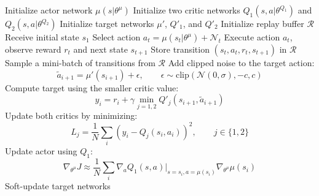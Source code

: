 \documentclass{article}
\begin{document}
\begin{algorithm}[t]
\caption{TD3}
\label{alg:td3}
\begin{algorithmic}[1]
\State Initialize actor network $\mu(s|\theta^\mu)$
\State Initialize two critic networks $Q_1(s,a|\theta^{Q_1})$ and $Q_2(s,a|\theta^{Q_2})$
\State Initialize target networks $\mu'$, $Q'_1$, and $Q'_2$
\State Initialize replay buffer $\mathcal{R}$
    \State Receive initial state $s_1$
        \State Select action $a_t = \mu(s_t|\theta^\mu) + \mathcal{N}_t$
        \State Execute action $a_t$, observe reward $r_t$ and next state $s_{t+1}$
        \State Store transition $(s_t,a_t,r_t,s_{t+1})$ in $\mathcal{R}$
        \State Sample a mini-batch of transitions from $\mathcal{R}$
        \State Add clipped noise to the target action:
        \[
        \tilde{a}_{i+1} = \mu'(s_{i+1}) + \epsilon,
        \qquad
        \epsilon \sim \mathrm{clip}(\mathcal{N}(0,\sigma), -c, c)
        \]
        \State Compute target using the smaller critic value:
        \[
        y_i = r_i + \gamma \min_{j=1,2} Q'_j(s_{i+1}, \tilde{a}_{i+1})
        \]
        \State Update both critics by minimizing:
        \[
        L_j = \frac{1}{N}\sum_i \left(y_i - Q_j(s_i,a_i)\right)^2,
        \qquad j \in \{1,2\}
        \]
            \State Update actor using $Q_1$:
            \[
            \nabla_{\theta^\mu}J \approx
            \frac{1}{N}\sum_i
            \nabla_a Q_1(s,a)|_{s=s_i,a=\mu(s_i)}
            \nabla_{\theta^\mu}\mu(s_i)
            \]
            \State Soft-update target networks
        \EndIf
    \EndFor
\EndFor
\end{algorithmic}
\end{algorithm}



\end{document}
